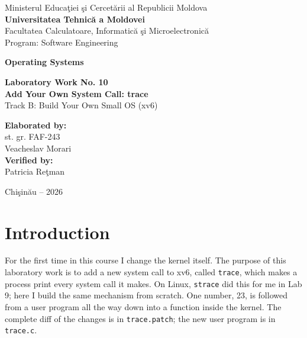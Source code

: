 \documentclass[12pt,a4paper]{article}
\begin{document}
\begin{titlepage}
    \centering
    Ministerul Educa\c{t}iei \c{s}i Cercet\u{a}rii al Republicii Moldova\\[0.4cm]
    \textbf{Universitatea Tehnic\u{a} a Moldovei}\\[0.4cm]
    Facultatea Calculatoare, Informatic\u{a} \c{s}i Microelectronic\u{a}\\[0.2cm]
    Program: Software Engineering

    \vspace{3cm}

    {\LARGE \textbf{Operating Systems}}

    \vspace{1.2cm}

    {\Large \textbf{Laboratory Work No. 10}}\\[0.6cm]
    {\LARGE \textbf{Add Your Own System Call: trace}}\\[0.3cm]
    Track B: Build Your Own Small OS (xv6)

    \vspace{3cm}

    \begin{flushright}
        \textbf{Elaborated by:}\\
        st. gr. FAF-243\\
        Veacheslav Morari\\[0.6cm]
        \textbf{Verified by:}\\
        Patricia Re\c{t}man
    \end{flushright}

    \vfill
    Chi\c{s}in\u{a}u -- 2026
\end{titlepage}

\tableofcontents
\newpage

\section*{Introduction}

For the first time in this course I change the kernel itself. The purpose of this laboratory work is to add a new system call to xv6, called \texttt{trace}, which makes a process print every system call it makes. On Linux, \texttt{strace} did this for me in Lab 9; here I build the same mechanism from scratch. One number, 23, is followed from a user program all the way down into a function inside the kernel. The complete diff of the changes is in \texttt{trace.patch}; the new user program is in \texttt{trace.c}.
\end{document}
